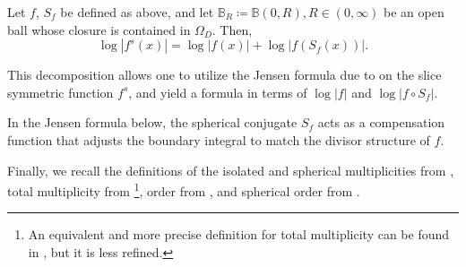 \documentclass{amsart}
\begin{document}
\begin{corr}\label{sphericalConj}
    Let $f$, $S_f$ be defined as above, and let $\mathbb{B}_R\coloneq\mathbb{B}(0,R), R\in(0,\infty)$ be an open ball whose closure is contained in $\Omega_D$. Then, \[\log |f^s(x)|=\log|f(x)|+\log|f(S_f(x))|.\]
\end{corr}
This decomposition allows one to utilize the Jensen formula due to \cite{Altavilla_2019} on the slice symmetric function $f^s$, and yield a formula in terms of $\log|f|$ and $\log|f\circ S_f|$. 

In the Jensen formula below, the spherical conjugate $S_f$ acts as a compensation function that adjusts the boundary integral to match the divisor structure of $f$. 

Finally, we recall the definitions of the isolated and spherical multiplicities from \cite[Definition 3.12]{Stoppato_2012},  total multiplicity from \cite[Definition 6.13]{GENTILI2007279} \footnote{An equivalent and more precise definition for total multiplicity can be found in \cite[Definition 14]{Ghiloni_2011}, but it is less refined.}, order from \cite[Definition 5.18]{GENTILI2007279}, and spherical order from \cite[Definition 5.30]{GENTILI2007279}.  
\end{document}
